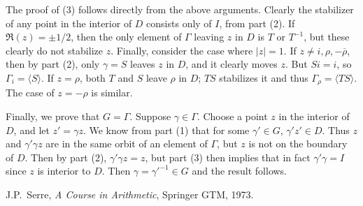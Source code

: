 \documentclass[12pt]{article}
\begin{document}
The proof of (3) follows directly from the above arguments. Clearly the stabilizer of any point in the interior of $D$ consists only of $I$, from part (2). If $\Re(z)=\pm 1/2$, then the only element of $\Gamma$ leaving $z$ in $D$ is $T$ or $T^{-1}$, but these clearly do not stabilize $z$. Finally, consider the case where $\lvert z\rvert=1$. If $z\neq i, \rho,-\overline{\rho}$, then by part (2), only $\gamma=S$ leaves $z$ in $D$, and it clearly moves $z$. But $Si=i$, so $\Gamma_i=\langle S\rangle$. If $z=\rho$, both $T$ and $S$ leave $\rho$ in $D$; $TS$ stabilizes it and thus $\Gamma_{\rho}=\langle TS\rangle$. The case of $z=-\rho$ is similar.

Finally, we prove that $G=\Gamma$. Suppose $\gamma\in\Gamma$. Choose a point $z$ in the interior of $D$, and let $z'=\gamma z$. We know from part (1) that for some $\gamma'\in G$, $\gamma'z'\in D$. Thus $z$ and $\gamma'\gamma z$ are in the same orbit of an element of $\Gamma$, but $z$ is not on the boundary of $D$. Then by part (2), $\gamma'\gamma z=z$, but part (3) then implies that in fact $\gamma'\gamma=I$ since $z$ is interior to $D$. Then $\gamma=\gamma'^{-1}\in G$ and the result follows.

\begin{thebibliography}{10}
J.P.~Serre, \emph{A Course in Arithmetic}, Springer GTM, 1973.
\end{thebibliography}
\end{document}
